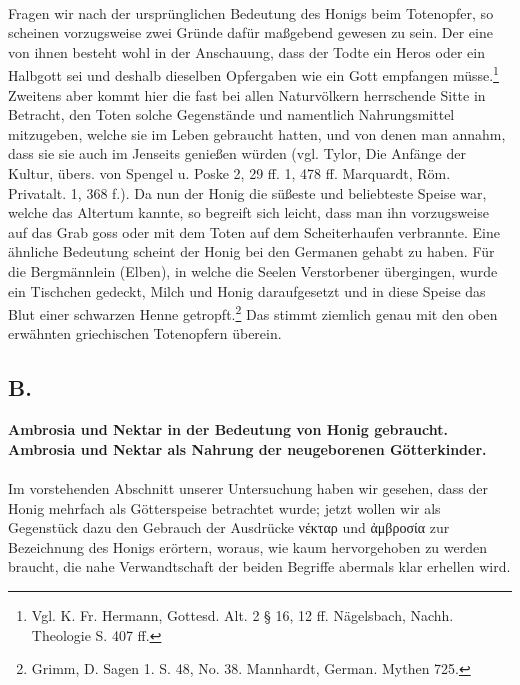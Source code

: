 \documentclass[a4paper, 11pt, oneside]{article}
\begin{document}
\paragraph{}
Fragen wir nach der ursprünglichen Bedeutung des Honigs beim Totenopfer, so scheinen vorzugsweise zwei Gründe dafür maßgebend gewesen zu sein. Der eine von ihnen besteht wohl in der Anschauung, dass der Todte ein Heros oder ein Halbgott sei und deshalb dieselben Opfergaben wie ein Gott empfangen müsse.\footnote{Vgl. K. Fr. Hermann, Gottesd. Alt. 2 § 16, 12 ff. Nägelsbach, Nachh. Theologie S. 407 ff.} Zweitens aber kommt hier die fast bei allen Naturvölkern herrschende Sitte in Betracht, den Toten solche Gegenstände und namentlich Nahrungsmittel mitzugeben, welche sie im Leben gebraucht hatten, und von denen man annahm, dass sie sie auch im Jenseits genießen würden (vgl. Tylor, Die Anfänge der Kultur, übers. von Spengel u. Poske 2, 29 ff. 1, 478 ff. Marquardt, Röm. Privatalt. 1, 368 f.). Da nun der Honig die süßeste und beliebteste Speise war, welche das Altertum kannte, so begreift sich leicht, dass man ihn vorzugsweise auf das Grab goss oder mit dem Toten auf dem Scheiterhaufen verbrannte. Eine ähnliche Bedeutung scheint der Honig bei den Germanen gehabt zu haben. Für die Bergmännlein (Elben), in welche die Seelen Verstorbener übergingen, wurde ein Tischchen gedeckt, Milch und Honig daraufgesetzt und in diese Speise das Blut einer schwarzen Henne getropft.\footnote{Grimm, D. Sagen 1. S. 48, No. 38. Mannhardt, German. Mythen 725.} Das stimmt ziemlich genau mit den oben erwähnten griechischen Totenopfern überein.

\subsection{B.}
\begin{center}
\textbf{Ambrosia und Nektar in der Bedeutung von Honig gebraucht. Ambrosia und Nektar als Nahrung der neugeborenen Götterkinder.}
\end{center}
\paragraph{}
Im vorstehenden Abschnitt unserer Untersuchung haben wir gesehen, dass der Honig mehrfach als Götterspeise betrachtet wurde; jetzt wollen wir als Gegenstück dazu den Gebrauch der Ausdrücke νέκταρ und ἀμβροσία zur Bezeichnung des Honigs erörtern, woraus, wie kaum hervorgehoben zu werden braucht, die nahe Verwandtschaft der beiden Begriffe abermals klar erhellen wird.
\end{document}
